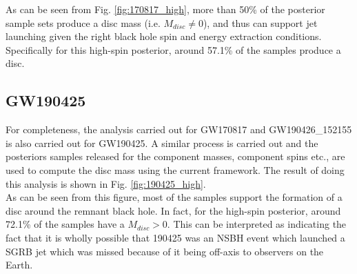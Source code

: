     As can be seen from Fig. \ref{fig:170817_high}, more than 50\% of the posterior
    sample sets produce a disc mass (i.e. $M_{disc} \neq 0$), and thus can support jet
    launching given the right black hole spin and energy extraction conditions.
    Specifically for this high-spin posterior, around 57.1\% of the samples produce a
    disc.\\

    \subsection{GW190425}\label{ssec:nsbh_190425}

        For completeness, the analysis carried out for GW170817 and GW190426\_152155 is
        also carried out for GW190425. A similar process is carried out and the
        posteriors samples released for the component masses, component spins etc., are
        used to compute the disc mass using the current framework. The result of doing
        this analysis is shown in Fig. \ref{fig:190425_high}.\\
        As can be seen from this figure, most of the samples support the formation of
        a disc around the remnant black hole. In fact, for the high-spin posterior,
        around 72.1\% of the samples have a $M_{disc} > 0$. This can be interpreted
        as indicating the fact that it is wholly possible that 190425 was an NSBH event
        which launched a SGRB jet which was missed because of it being off-axis to
        observers on the Earth.\\

